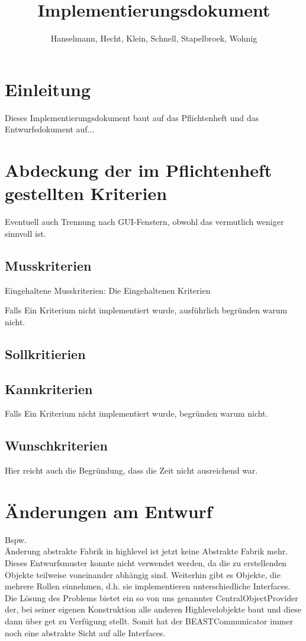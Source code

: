 \documentclass[a4paper]{scrreprt}
\begin{document}
\title{Implementierungsdokument}
\author{Hanselmann, Hecht, Klein, Schnell, Stapelbroek, Wohnig}
\maketitle 
\tableofcontents	

\chapter{Einleitung}
Dieses Implementierungsdokument baut auf das Pflichtenheft und das Entwurfsdokument auf...

\chapter{Abdeckung der im Pflichtenheft gestellten Kriterien}

Eventuell auch Trennung nach GUI-Fenstern, obwohl das vermutlich weniger sinnvoll ist.
\section{Musskriterien}
Eingehaltene Musskriterien: 
Die Eingehaltenen Kriterien

Falls Ein Kriterium nicht implementiert wurde, ausführlich begründen warum nicht.




\section{Sollkritierien}
\section{Kannkriterien}
Falls Ein Kriterium nicht implementiert wurde, begründen warum nicht. 
\section{Wunschkriterien}
Hier reicht auch die Begründung, dass die Zeit nicht ausreichend war.

\chapter{Änderungen am Entwurf}
Bspw. \\
Änderung abstrakte Fabrik in highlevel ist jetzt keine Abstrakte Fabrik mehr.\\ Dieses Entwurfsmuster konnte nicht verwendet werden, da die zu erstellenden Objekte teilweise voneinander abhängig sind. Weiterhin gibt es Objekte, die mehrere Rollen einnehmen, d.h. sie implementieren unterschiedliche Interfaces. \\
Die Lösung des Problems bietet ein so von uns genannter CentralObjectProvider der, bei seiner eigenen Konstruktion alle anderen Highlevelobjekte baut und diese dann über get zu Verfügung stellt.
Somit hat der BEASTCommunicator immer noch eine abstrakte Sicht auf alle Interfaces.
\end{document}
